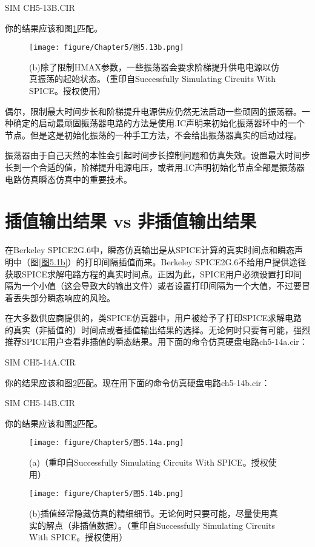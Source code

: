 SIM CH5-13B.CIR

你的结果应该和图\ref{图5.13b}匹配。

\begin{figure}[htbp]
\small
    \centering
    \texttt{[image: figure/Chapter5/图5.13b.png]}
    \caption{(b)除了限制HMAX参数，一些振荡器会要求阶梯提升供电电源以仿真振荡的起始状态。（重印自Successfully Simulating Circuits With SPICE。授权使用）}
    \label{图5.13b}
\end{figure}

偶尔，限制最大时间步长和阶梯提升电源供应仍然无法启动一些顽固的振荡器。一种确定的启动最顽固振荡器电路的方法是使用.IC声明来初始化振荡器环中的一个节点。但是这是初始化振荡的一种手工方法，不会给出振荡器真实的启动过程。

振荡器由于自己天然的本性会引起时间步长控制问题和仿真失效。设置最大时间步长到一个合适的值，阶梯提升电源电压，或者用.IC声明初始化节点全部是振荡器电路仿真瞬态仿真中的重要技术。

\section{插值输出结果 vs 非插值输出结果}
在Berkeley SPICE2G.6中，瞬态仿真输出是从SPICE计算的真实时间点和瞬态声明中（图\ref{图5.1b}）的打印间隔插值而来。Berkeley SPICE2G.6不给用户提供途径获取SPICE求解电路方程的真实时间点。正因为此，SPICE用户必须设置打印间隔为一个小值（这会导致大的输出文件）或者设置打印间隔为一个大值，不过要冒着丢失部分瞬态响应的风险。

在大多数供应商提供的，类SPICE仿真器中，用户被给予了打印SPICE求解电路的真实（非插值的）时间点或者插值输出结果的选择。无论何时只要有可能，强烈推荐SPICE用户查看非插值的瞬态结果。用下面的命令仿真硬盘电路ch5-14a.cir：

SIM CH5-14A.CIR

你的结果应该和图\ref{图5.14a}匹配。现在用下面的命令仿真硬盘电路ch5-14b.cir：

SIM CH5-14B.CIR

你的结果应该和图\ref{图5.14b}匹配。

\begin{figure}[htbp]
\small
    \centering
    \texttt{[image: figure/Chapter5/图5.14a.png]}
    \caption{(a)（重印自Successfully Simulating Circuits With SPICE。授权使用）}
    \label{图5.14a}
\end{figure}

\begin{figure}[htbp]
\small
    \centering
    \texttt{[image: figure/Chapter5/图5.14b.png]}
    \caption{(b)插值经常隐藏仿真的精细细节。无论何时只要可能，尽量使用真实的解点（非插值数据）。（重印自Successfully Simulating Circuits With SPICE。授权使用）}
    \label{图5.14b}
\end{figure}

